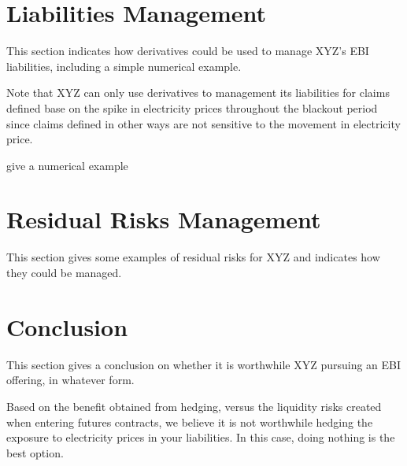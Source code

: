 \documentclass[12pt]{article}
\begin{document}
\section{Liabilities Management}
\begin{flushleft}
This section indicates how derivatives could be used to manage XYZ’s EBI liabilities, including a simple numerical example. \par
Note that XYZ can only use derivatives to management its liabilities for claims defined base on the spike in electricity prices throughout the blackout period since claims defined in other ways are not sensitive to the movement in electricity price. \par

\end{flushleft}

give a numerical example
\frameboxend
\newpage

\section{Residual Risks Management}
\begin{flushleft}
This section gives some examples of residual risks for XYZ and indicates how they could be managed. 
\end{flushleft}
\newpage

\section{Conclusion}
\begin{flushleft}
This section gives a conclusion on whether it is worthwhile XYZ pursuing an EBI offering, in whatever form. 

Based on the benefit obtained from hedging, versus the liquidity risks created when
entering futures contracts, we believe it is not worthwhile hedging the exposure to electricity prices in your liabilities. In this case, doing nothing is the best option.
\end{flushleft}
\newpage

\printbibliography[heading=bibintoc]
\end{document}
